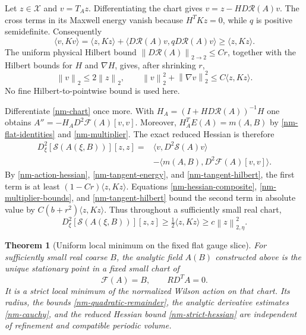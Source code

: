 \documentclass[11pt]{article}
\newtheorem{theorem}{Theorem}
\theoremstyle{remark}\newtheorem{remark}[theorem]{Remark}
\newcommand{\norm}[1]{\left\lVert#1\right\rVert}
\begin{document}
Let $z\in\mathcal X$ and $v=T_Az$. Differentiating the chart gives
$v=z-HD\mathcal R(A)v$. The cross terms in its Maxwell energy
vanish because $H^TKz=0$, while $q$ is positive semidefinite.
Consequently
\begin{equation}\label{nm-tangent-energy}
 \langle v,Kv\rangle
 =\langle z,Kz\rangle+
   \langle D\mathcal R(A)v,qD\mathcal R(A)v\rangle
 \ge\langle z,Kz\rangle.
\end{equation}
The uniform physical Hilbert bound $\norm{D\mathcal R(A)}_{2\to2}
\le Cr$, together with the Hilbert bounds for $H$ and $\nabla H$,
gives, after shrinking $r$,
\begin{equation}\label{nm-tangent-hilbert}
 \norm{v}_2\le2\norm{z}_2,\qquad
 \norm{v}_2^2+\norm{\nabla v}_2^2
 \le C\langle z,Kz\rangle.
\end{equation}
No fine Hilbert-to-pointwise bound is used here.

Differentiate \eqref{nm-chart} once more. With
$H_A=(I+HD\mathcal R(A))^{-1}H$ one obtains
$A''=-H_AD^2\mathcal F(A)[v,v]$. Moreover,
$H_A^TE(A)=m(A,B)$ by \eqref{nm-flat-identities} and
\eqref{nm-multiplier}. The exact reduced Hessian is therefore
\begin{equation}\label{nm-reduced-hessian}
 \begin{split}
 D_\xi^2[\mathcal S(A(\xi,B))][z,z]
 ={}&\langle v,D^2\mathcal S(A)v\rangle\\
 &-\langle m(A,B),D^2\mathcal F(A)[v,v]\rangle.
 \end{split}
\end{equation}
By \eqref{nm-action-hessian}, \eqref{nm-tangent-energy}, and
\eqref{nm-tangent-hilbert}, the first term is at least
$(1-Cr)\langle z,Kz\rangle$. Equations
\eqref{nm-hessian-composite}, \eqref{nm-multiplier-bounds}, and
\eqref{nm-tangent-hilbert} bound the second term in absolute value
by $C(b+r^2)\langle z,Kz\rangle$. Thus throughout a sufficiently
small real chart,
\begin{equation}\label{nm-strict-hessian}
 D_\xi^2[\mathcal S(A(\xi,B))][z,z]
 \ge\tfrac12\langle z,Kz\rangle
 \ge c\norm{z}_{2,\eta}^2.
\end{equation}

\begin{theorem}[Uniform local minimum on the fixed flat gauge slice]
\label{nm-theorem}
For sufficiently small real coarse $B$, the analytic field $A(B)$
constructed above is the unique stationary point in a fixed small
chart of
\[
 \mathcal F(A)=B,\qquad RD^TA=0.
\]
It is a strict local minimum of the normalized Wilson action on
that chart. Its radius, the bounds \eqref{nm-quadratic-remainder},
the analytic derivative estimates \eqref{nm-cauchy}, and the reduced
Hessian bound \eqref{nm-strict-hessian} are independent of
refinement and compatible periodic volume.
\end{theorem}
\end{document}
